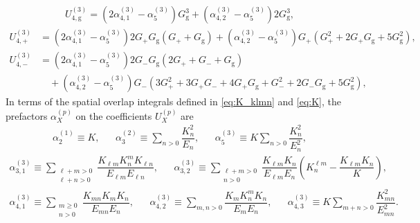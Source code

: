 \documentclass[preprint,showkeys,nofootinbib]{revtex4-1}
\newcommand{\f}{\dfrac} %
\newcommand{\p}[1]{\left(#1\right)} %
\newcommand{\g}{\text{g}}
\newcommand{\n}{\hat{n}}
\newcommand{\1}{\mathds{1}}
\begin{document}
\begin{align}
  U_{4,\g}^{(3)}
  = \p{2\alpha_{4,1}^{(3)} - \alpha_5^{(3)}} G_\g^3
  + \p{\alpha_{4,2}^{(3)} - \alpha_5^{(3)}} 2 G_\g^3,
\end{align}
\begin{align}
  U_{4,+}^{(3)}
  &= \p{2\alpha_{4,1}^{(3)} - \alpha_5^{(3)}}
  2 G_+ G_\g \p{G_+ + G_\g}
  + \p{\alpha_{4,2}^{(3)} - \alpha_5^{(3)}}
  G_+ \p{G_+^2 + 2 G_+ G_\g + 5 G_\g^2},
\end{align}
\begin{align}
  U_{4,-}^{(3)}
  &= \p{2\alpha_{4,1}^{(3)} - \alpha_5^{(3)}}
  2 G_- G_\g \p{2 G_+ + G_- + G_\g} \nonumber \\
  &\quad + \p{\alpha_{4,2}^{(3)} - \alpha_5^{(3)}}
  G_- \p{3 G_+^2 + 3 G_+ G_- + 4 G_+ G_\g + G_-^2
    + 2 G_- G_\g + 5 G_\g^2},
\end{align}
In terms of the spatial overlap integrals defined in \eqref{eq:K_klmn}
and \eqref{eq:K}, the prefactors $\alpha_X^{(p)}$ on the coefficients
$U_X^{(p)}$ are
\begin{align}
  \alpha_2^{(1)} \equiv K,
  &&
  \alpha_3^{(2)} \equiv \sum_{n>0} \f{K_n^2}{E_n},
  &&
  \alpha_5^{(3)}
  \equiv  K \sum_{n>0} \f{K_n^2}{E_n^2},
\end{align}
\begin{align}
  \alpha_{3,1}^{(3)} \equiv \sum_{\substack{\ell+m>0\\\ell+n>0}}
  \f{K_{\ell m} K^m_n K_{\ell n}}{E_{\ell m} E_{\ell n}},
  &&
  \alpha_{3,2}^{(3)}
  \equiv \sum_{\substack{\ell+m>0\\n>0}}
  \f{K_{\ell m} K_n}{E_{\ell m} E_n}
  \p{K^{\ell m}_n - \f{K_{\ell m} K_n}{K}},
\end{align}
\begin{align}
  \alpha_{4,1}^{(3)}
  \equiv \sum_{\substack{m\ge0\\n>0}} \f{K_{mn} K_m K_n}{E_{mn} E_n},
  &&
  \alpha_{4,2}^{(3)}
  \equiv \sum_{m,n>0} \f{K_m K^m_n K_n}{E_m E_n},
  &&
  \alpha_{4,3}^{(3)}
  \equiv K \sum_{m+n>0} \f{K_{mn}^2}{E_{mn}^2}.
\end{align}


\end{document}
